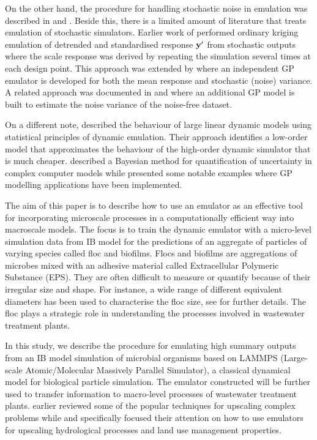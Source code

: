 On the other hand, the procedure for handling stochastic noise in emulation was described in \citet{pd26} and \citet{pd27}. Beside this, there is a limited amount of literature that treats emulation of stochastic simulators. Earlier work of \citet{pd23} performed ordinary kriging emulation of detrended and standardised response ${\bf y}'$ from stochastic outputs where the scale response was derived by repeating the simulation several times at each design point. This approach was extended by \citet{pd24} where an independent GP emulator is developed for both the mean response and stochastic (noise) variance.  A related approach was documented in \citet{pd22} and \citet{pd25} where an additional GP model is built to estimate the noise variance of the noise-free dataset.

On a different note, \cite{83} described the behaviour of large linear dynamic models using statistical principles of dynamic emulation. Their approach identifies a low-order model that approximates the behaviour of the high-order dynamic simulator that is much cheaper. \cite{q5} described a Bayesian method for quantification of uncertainty in complex computer models while \cite{q17} presented some notable examples where GP modelling applications have been implemented. 

The aim of this paper is to describe how to use an emulator as an effective tool for incorporating microscale processes in a computationally efficient way into macroscale models. The focus is to train the dynamic emulator with a micro-level simulation data from IB model for the predictions of an aggregate of particles of varying species called floc and biofilms. Flocs and biofilms are aggregations of microbes mixed with an adhesive material called Extracellular Polymeric Substance (EPS). They are often difficult to measure or quantify because of their irregular size and shape.  For instance, a wide range of different equivalent diameters has been used to characterise the floc size, see \citet{l3} for further details. The floc plays a strategic role in understanding the processes involved in wastewater treatment plants. %

In this study, we describe the procedure for emulating high summary outputs from an IB model simulation of microbial organisms based on LAMMPS (Large-scale Atomic/Molecular Massively Parallel Simulator), a classical dynamical model for biological particle simulation. The emulator constructed will be further used to transfer information to macro-level processes of wastewater treatment plants. \citet{l9} earlier reviewed some of the popular techniques for upscaling complex problems while \citet{l4} and \citet{l8} specifically focused their attention on how to use emulators for upscaling hydrological processes and land use management properties.

